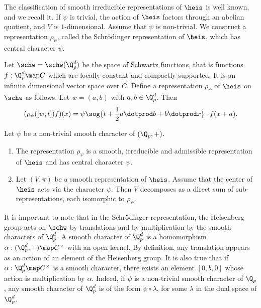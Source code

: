 The classification of smooth irreducible representations of $\heis$ is well known, and we recall it.
If $\psi$ is trivial, the action of $\heis$ factors through an abelian quotient, and $V$ is $1$-dimensional.
Assume that $\psi$ is non-trivial.
We construct a representation $\rho_\psi$, called the Schrödinger representation of $\heis$, which has central character $\psi$.

Let $\schw=\schw(\Q_p^d)$ be the space of Schwartz functions, that is functions $f:\Q_p^d\map C$ which are locally constant and compactly supported.
It is an infinite dimensional vector space over $C$.
Define a representation $\rho_\psi$ of $\heis$ on $\schw$ as follows.
Let $w=(a,b)$ with $a,b\in\Q_p^d$.
Then
\[(\rho_{\psi}([w,t])f)(x)=\psi\sog{t+\frac{1}{2}a\dotprod b+b\dotprod x}\cdot f(x+a).\]

\begin{thm}
Let $\psi$ be a non-trivial smooth character of $(\Q_p,+)$.
    \begin{enumerate}
    \item The representation $\rho_\psi$ is a smooth, irreducible and admissible representation of $\heis$ and has central character $\psi$.
    \item Let $(V,\pi)$ be a smooth representation of $\heis$.
    Assume that the center of $\heis$ acts via the character $\psi$.
    Then $V$ decomposes as a direct sum of sub-representations, each isomorphic to $\rho_\psi$.
    \end{enumerate}
\end{thm} 

It is important to note that in the Schrödinger representation, the Heisenberg group acts on $\schw$ by translations and by multiplication by the smooth characters of $\Q_p^d$.
A smooth character of $\Q_p^d$ is a homomorphism $\alpha:(\Q_p^d,+)\map C^\times$ with an open kernel.
By definition, any translation appears as an action of an element of the Heisenberg group. 
It is also true that if $\alpha:\Q_p^d\map C^{\times}$ is a smooth character, there exists an element $[0,b,0]$ whose action is multiplication by $\alpha$.
Indeed, if $\psi$ is a non-trivial smooth character of $\Q_p$, any smooth character of $\Q_p^d$ is of the form $\psi\circ \lambda$, for some $\lambda$ in the dual space of $\Q_p^d$.

